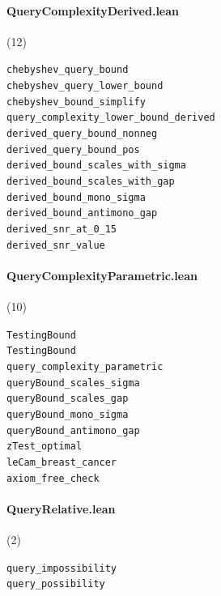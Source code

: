 \paragraph{QueryComplexityDerived.lean} (12)

{\footnotesize
\texttt{chebyshev\_query\_bound}\\
\texttt{chebyshev\_query\_lower\_bound}\\
\texttt{chebyshev\_bound\_simplify}\\
\texttt{query\_complexity\_lower\_bound\_derived}\\
\texttt{derived\_query\_bound\_nonneg}\\
\texttt{derived\_query\_bound\_pos}\\
\texttt{derived\_bound\_scales\_with\_sigma}\\
\texttt{derived\_bound\_scales\_with\_gap}\\
\texttt{derived\_bound\_mono\_sigma}\\
\texttt{derived\_bound\_antimono\_gap}\\
\texttt{derived\_snr\_at\_0\_15}\\
\texttt{derived\_snr\_value}\\
}

\paragraph{QueryComplexityParametric.lean} (10)

{\footnotesize
\texttt{TestingBound}\\
\texttt{TestingBound}\\
\texttt{query\_complexity\_parametric}\\
\texttt{queryBound\_scales\_sigma}\\
\texttt{queryBound\_scales\_gap}\\
\texttt{queryBound\_mono\_sigma}\\
\texttt{queryBound\_antimono\_gap}\\
\texttt{zTest\_optimal}\\
\texttt{leCam\_breast\_cancer}\\
\texttt{axiom\_free\_check}\\
}

\paragraph{QueryRelative.lean} (2)

{\footnotesize
\texttt{query\_impossibility}\\
\texttt{query\_possibility}\\
}

